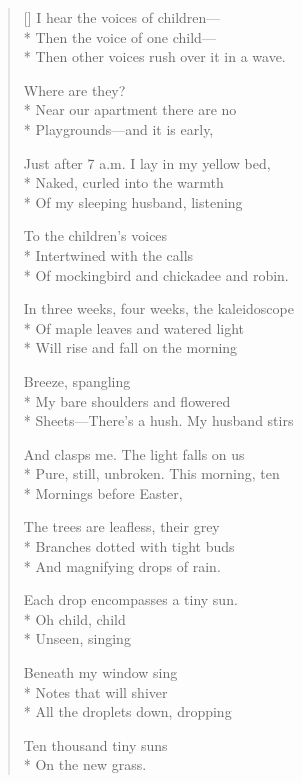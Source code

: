 \label{ch:friday_morning}
\settowidth{\versewidth}{Just after 7 a.m.     I lay in my yellow bed,}
\begin{verse}[\versewidth]
I hear the voices of children---\\*
Then the voice of one child---\\*
Then other voices rush over it in a wave.

Where are they?\\*
Near our apartment there are no\\*
Playgrounds---and it is early,

Just after 7 a.m.     I lay in my yellow bed,\\*
Naked, curled into the warmth\\*
Of my sleeping husband, listening

To the children's voices\\*
Intertwined with the calls\\*
Of mockingbird and chickadee and robin.

In three weeks, four weeks, the kaleidoscope\\*
Of maple leaves and watered light\\*
Will rise and fall on the morning

Breeze, spangling\\*
My bare shoulders and flowered\\*
Sheets---There's a hush.   My husband stirs

And clasps me.   The light falls on us\\*
Pure, still, unbroken.    This morning, ten\\*
Mornings before Easter,

The trees are leafless, their grey\\*
Branches dotted with tight buds\\*
And magnifying drops of rain.

Each drop encompasses a tiny sun.\\*
Oh child, child\\*
Unseen, singing


Beneath my window sing\\*
Notes that will shiver\\*
All the droplets down, dropping

Ten thousand tiny suns\\*
On the new grass.
\end{verse}
